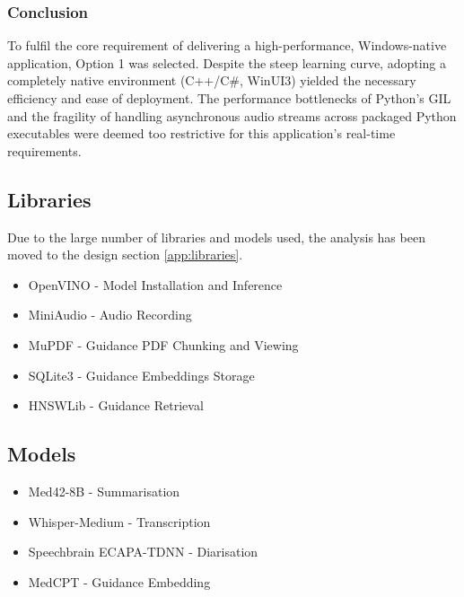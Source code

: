 \subsubsection{Conclusion}
To fulfil the core requirement of delivering a high-performance, Windows-native application, Option 1 was selected. Despite the steep learning curve, adopting a completely native environment (C++/C\#, WinUI3) yielded the necessary efficiency and ease of deployment. The performance bottlenecks of Python's GIL and the fragility of handling asynchronous audio streams across packaged Python executables were deemed too restrictive for this application's real-time requirements.

\subsection{Libraries}
Due to the large number of libraries and models used, the analysis has been moved to the design section \ref{app:libraries}.
\begin{itemize}
    \item OpenVINO - Model Installation and Inference
    \item MiniAudio - Audio Recording
    \item MuPDF - Guidance PDF Chunking and Viewing
    \item SQLite3 - Guidance Embeddings Storage
    \item HNSWLib - Guidance Retrieval
\end{itemize}

\subsection{Models}
\begin{itemize}
    \item Med42-8B - Summarisation
    \item Whisper-Medium - Transcription
    \item Speechbrain ECAPA-TDNN - Diarisation
    \item MedCPT - Guidance Embedding
\end{itemize}
